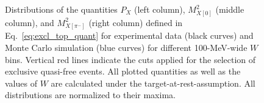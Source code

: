 \afterpage{\clearpage}
\begin{figure}[!ht]
\begin{center}
\end{center}
\caption{\small Distributions of the quantities $P_{X}$ (left column), $M^{2}_{X[0]}$ (middle column), and $M^{2}_{X[\pi^{-}]}$ (right column) defined in Eq.~\eqref{eq:excl_top_quant} for experimental data (black curves) and Monte Carlo simulation (blue curves) for different 100-MeV-wide $W$ bins. Vertical red lines indicate the cuts applied for the selection of exclusive quasi-free events. All plotted quantities as well as the values of $W$ are calculated under the target-at-rest-assumption. All distributions are normalized to their maxima.}
\label{fig:excl_top}
\end{figure}



